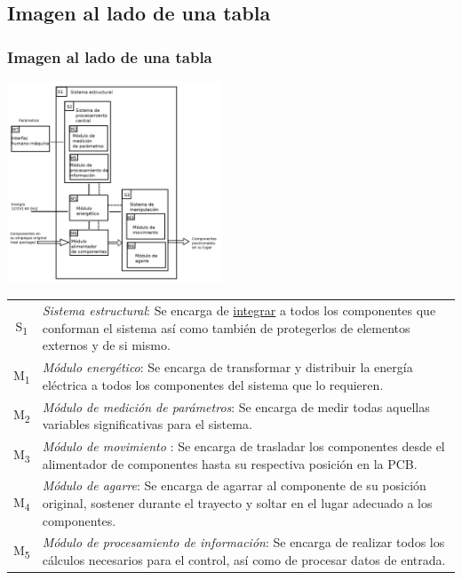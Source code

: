 	\begin{frame}
		\section{Imagen al lado de una tabla}
		\frametitle{Imagen al lado de una tabla}
		\begin{minipage}{\textwidth}
			\begin{minipage}{0.39\textwidth}
				\centering
				\includegraphics[height=60mm]{images/Arq Fisica}
			\end{minipage}
			\qquad
			\begin{minipage}{0.45\textwidth}
				{\tiny \begin{tabular}{c p{50mm}}
						S\textsubscript{1} & \textit{Sistema estructural}: Se encarga de \underline{integrar} a todos los componentes que conforman el sistema así como también de protegerlos de elementos externos y de si mismo.\\
						M\textsubscript{1} & \textit{Módulo energético}: Se encarga de transformar y distribuir la energía eléctrica a todos los componentes del sistema que lo requieren. \\
						M\textsubscript{2} & \textit{Módulo de medición de parámetros}: Se encarga de medir todas aquellas variables significativas para el sistema.\\
						M\textsubscript{3} & \textit{Módulo de movimiento }: Se encarga de trasladar los componentes desde el alimentador de componentes hasta su respectiva posición en la PCB.\\
						M\textsubscript{4} & \textit{Módulo de agarre}: Se encarga de agarrar al componente de su posición original, sostener durante el trayecto y soltar en el lugar adecuado a los componentes. \\
						M\textsubscript{5} & \textit{Módulo de procesamiento de información}: Se encarga de realizar todos los cálculos necesarios para el control, así como de procesar datos de entrada. \\

\end{tabular}}
\end{minipage}
\end{minipage}
\end{frame}
